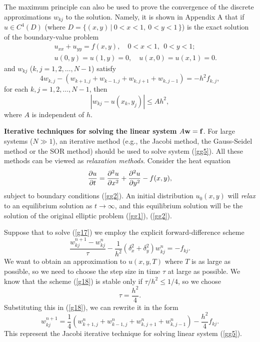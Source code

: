 \vskip 0.3cm  
The maximum principle can also be used
to prove the convergence of the discrete approximations $w_{kj}$ to the solution. Namely, it is shown
in Appendix A that if $u\in C^{4}(D)$ (where $D=\{(x,y)\, \vert \ 0<x<1, \ 0<y<1 \, \}$)
is the exact solution of the boundary-value
problem
\begin{eqnarray}
&&u_{xx}+u_{yy} = f(x,y), \quad 0<x<1, \ \ 0<y<1;     \label{gg1} \\
&&u(0,y) = u(1,y) = 0, \quad
u(x,0) =u(x,1) = 0.   \label{gg2}
\end{eqnarray}
and $w_{kj}$ ($k,j=1,2, \dots,N-1$) satisfy
\begin{equation}
4w_{k,j}-\left(w_{k+1,j}+w_{k-1,j}+w_{k,j+1}+w_{k,j-1}\right)
=-h^{2}f_{k,j}, \label{gg5}
\end{equation}
for each $k,j=1,2,\dots,N-1$, then
\[
\left\vert w_{kj}-u(x_{k}, y_{j})\right\vert \leq Ah^{2},
\]
where $A$ is independent of $h$.



\vskip 0.5cm  
{\bf Iterative techniques for solving the linear system} $A{\bf w}={\bf f}$.
For large systems ($N\gg 1$), an iterative
method (e.g., the Jacobi method, the Gauss-Seidel method or the SOR method) should
be used to solve system (\ref{gg5}). All these methods can be viewed as {\it relaxation methods}.
Consider the heat equation
\begin{equation}
\frac{{\partial} u}{{\partial} t}=\frac{{\partial}^2 u}{{\partial} x^2}+\frac{{\partial}^2 u}{{\partial} y^2} - f(x,y),   \label{g17}
\end{equation}
subject to boundary conditions (\ref{gg2}). An initial distribution $u_{0}(x,y)$ will {\it relax} to
an equilibrium solution as $t\to\infty$, and this equilibrium solution will be the solution of the
original elliptic problem (\ref{gg1}), (\ref{gg2}).

\vskip 0.5cm  
Suppose that to solve (\ref{g17}) we employ the explicit forward-difference scheme
\begin{equation}
\frac{w_{kj}^{n+1}-w_{kj}^{n}}{\tau} -\frac{1}{h^2}\left(
\delta_{x}^2+\delta_{y}^2\right)w_{kj}^{n}=-f_{kj}. \label{g18}
\end{equation}
We want to obtain an approximation to $u(x,y,T)$ where $T$ is as large as possible,
so we need to choose the step size in time $\tau$ at large as possible. We know that the
scheme (\ref{g18}) is stable only if $\tau/h^2\leq 1/4$, so we choose
\[
\tau=\frac{h^2}{4}.
\]
Substituting this in (\ref{g18}), we can rewrite it in the form
\begin{equation}
w_{kj}^{n+1}=\frac{1}{4}\left(w^{n}_{k+1,j}+w^{n}_{k-1,j}+w^{n}_{k,j+1}+w^{n}_{k,j-1}\right)
-\frac{h^2}{4}f_{kj}. \label{g19}
\end{equation}
This represent the Jacobi iterative technique for solving
linear system (\ref{gg5}).


